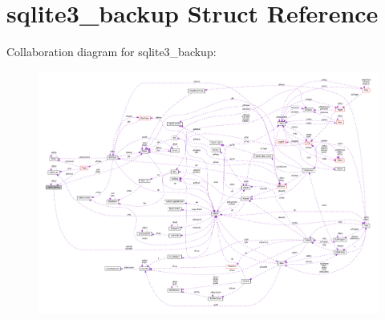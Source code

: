 \hypertarget{structsqlite3__backup}{\section{sqlite3\-\_\-backup Struct Reference}
\label{structsqlite3__backup}
}


Collaboration diagram for sqlite3\-\_\-backup\-:\nopagebreak
\begin{figure}[H]
\begin{center}
\leavevmode
\includegraphics[width=350pt]{structsqlite3__backup__coll__graph}
\end{center}
\end{figure}

